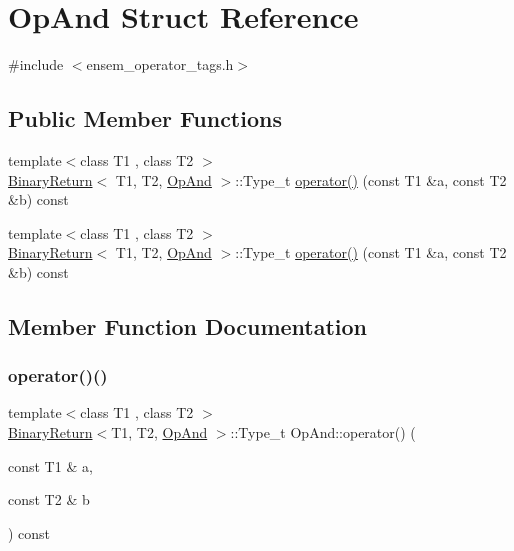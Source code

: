 \hypertarget{structOpAnd}{}\section{Op\+And Struct Reference}
\label{structOpAnd}


{\ttfamily \#include $<$ensem\+\_\+operator\+\_\+tags.\+h$>$}

\subsection*{Public Member Functions}
\begin{DoxyCompactItemize}
\item 
{\footnotesize template$<$class T1 , class T2 $>$ }\\\mbox{\hyperlink{structBinaryReturn}{Binary\+Return}}$<$ T1, T2, \mbox{\hyperlink{structOpAnd}{Op\+And}} $>$\+::Type\+\_\+t \mbox{\hyperlink{structOpAnd_a27c9f5545b8961284cc388628ac2f9bb}{operator()}} (const T1 \&a, const T2 \&b) const
\item 
{\footnotesize template$<$class T1 , class T2 $>$ }\\\mbox{\hyperlink{structBinaryReturn}{Binary\+Return}}$<$ T1, T2, \mbox{\hyperlink{structOpAnd}{Op\+And}} $>$\+::Type\+\_\+t \mbox{\hyperlink{structOpAnd_a27c9f5545b8961284cc388628ac2f9bb}{operator()}} (const T1 \&a, const T2 \&b) const
\end{DoxyCompactItemize}


\subsection{Member Function Documentation}
\mbox{\label{structOpAnd_a27c9f5545b8961284cc388628ac2f9bb}} 
\subsubsection{\texorpdfstring{operator()()}{operator()()}\hspace{0.1cm}{\footnotesize\ttfamily [1/2]}}
{\footnotesize\ttfamily template$<$class T1 , class T2 $>$ \\
\mbox{\hyperlink{structBinaryReturn}{Binary\+Return}}$<$T1, T2, \mbox{\hyperlink{structOpAnd}{Op\+And}} $>$\+::Type\+\_\+t Op\+And\+::operator() (\begin{DoxyParamCaption}\item[{const T1 \&}]{a,  }\item[{const T2 \&}]{b }\end{DoxyParamCaption}) const\hspace{0.3cm}{\ttfamily [inline]}}

